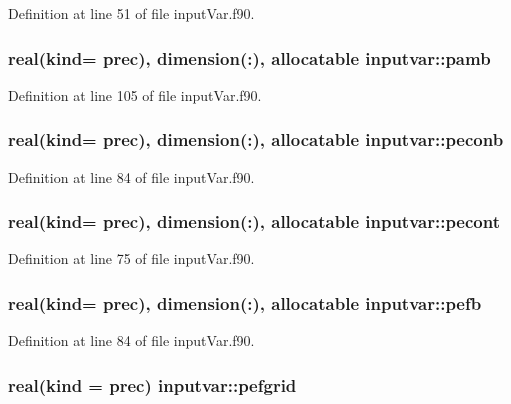 Definition at line 51 of file input\-Var.\-f90.

\hypertarget{classinputvar_a241f8b7a07fdc252022c2ef56cfded42}{
\subsubsection[{pamb}]{\setlength{\rightskip}{0pt plus 5cm}real(kind= prec), dimension(\-:), allocatable inputvar\-::pamb}}\label{classinputvar_a241f8b7a07fdc252022c2ef56cfded42}


Definition at line 105 of file input\-Var.\-f90.

\hypertarget{classinputvar_adfc7efd23b85b75ea9411b9da5e8ccbd}{
\subsubsection[{peconb}]{\setlength{\rightskip}{0pt plus 5cm}real(kind= prec), dimension(\-:), allocatable inputvar\-::peconb}}\label{classinputvar_adfc7efd23b85b75ea9411b9da5e8ccbd}


Definition at line 84 of file input\-Var.\-f90.

\hypertarget{classinputvar_a1f575248c5370894cd5abbad18ace926}{
\subsubsection[{pecont}]{\setlength{\rightskip}{0pt plus 5cm}real(kind= prec), dimension(\-:), allocatable inputvar\-::pecont}}\label{classinputvar_a1f575248c5370894cd5abbad18ace926}


Definition at line 75 of file input\-Var.\-f90.

\hypertarget{classinputvar_a3484e64c94e8f61527a9843039243703}{
\subsubsection[{pefb}]{\setlength{\rightskip}{0pt plus 5cm}real(kind= prec), dimension(\-:), allocatable inputvar\-::pefb}}\label{classinputvar_a3484e64c94e8f61527a9843039243703}


Definition at line 84 of file input\-Var.\-f90.

\hypertarget{classinputvar_aeb238280e9c8d1526ff6c11142a32cda}{
\subsubsection[{pefgrid}]{\setlength{\rightskip}{0pt plus 5cm}real(kind = prec) inputvar\-::pefgrid}}\label{classinputvar_aeb238280e9c8d1526ff6c11142a32cda}


